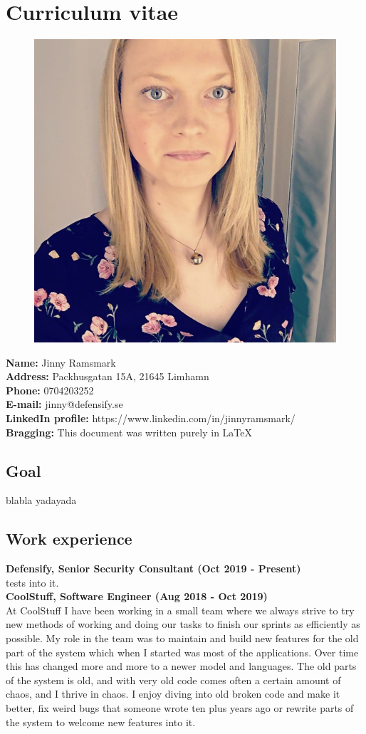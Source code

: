\documentclass[12pt,a4paper,oneside]{article}
\begin{document}
\section*{Curriculum vitae}

\begin{figure}
	\includegraphics[width=3cm\textwidth,right]{profile.png}
\end{figure}


\textbf{Name:} Jinny Ramsmark \\
\textbf{Address:} Packhusgatan 15A, 21645 Limhamn \\
\textbf{Phone:} 0704203252 \\
\textbf{E-mail:} jinny@defensify.se \\
\textbf{LinkedIn profile:} https://www.linkedin.com/in/jinnyramsmark/ \\
\textbf{Bragging:} This document was written purely in \LaTeX \\

\subsection*{Goal}

blabla yadayada

\subsection*{Work experience}

\textbf{Defensify, Senior Security Consultant (Oct 2019 - Present)} \\
tests into it. \\

\textbf{CoolStuff, Software Engineer (Aug 2018 - Oct 2019)} \\
At CoolStuff I have been working in a small team where we always strive to try new methods of working and doing our tasks to finish our sprints as efficiently as possible. My role in the team was to maintain and build new features for the old part of the system which when I started was most of the applications. Over time this has changed more and more to a newer model and languages. The old parts of the system is old, and with very old code comes often a certain amount of chaos, and I thrive in chaos. I enjoy diving into old broken code and make it better, fix weird bugs that someone wrote ten plus years ago or rewrite parts of the system to welcome new features into it. \\
\end{document}
